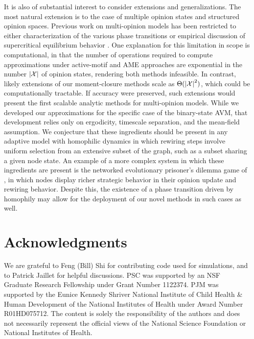 \documentclass[review, onefignum, onetabnum]{siamart171218}
\newcommand{\pc}[1]{{\color{comment_purple}[PC: #1]}}
\begin{document}
	It is also of substantial interest to consider extensions and generalizations. 
	The most natural extension is to the case of multiple opinion states and structured opinion spaces. 
	Previous work on multi-opinion models has been restricted to either characterization of the various phase transitions \cite{Bohme2012} or empirical discussion of supercritical equilibrium behavior \cite{Shi2013}. 
	One explanation for this limitation in scope is computational, in that the number of operations required to compute approximations under active-motif and AME approaches are exponential in the number $\left|\mathcal{X}\right|$ of opinion states, rendering both methods infeasible. 
	In contrast, likely extensions of our moment-closure methods scale as $\Theta(\left|\mathcal{X}\right|^2)$, which could be computationally tractable. 
	If accuracy were preserved, such extensions would present the first scalable analytic methods for multi-opinion models. 
	While we developed our approximations for the specific case of the binary-state AVM, that development relies only on ergodicity, timescale separation, and the mean-field assumption. 
	We conjecture that these ingredients should be present in any adaptive model with homophilic dynamics in which rewiring steps involve uniform selection from an extensive subset of the graph, such as a subset sharing a given node state. 
	An example of a more complex system in which these ingredients are present is the networked evolutionary prisoner's dilemma game of \cite{Lee2018}, in which nodes display richer strategic behavior in their opinion update and rewiring behavior. 
	Despite this, the existence of a phase transition driven by homophily may allow for the deployment of our novel methods in such cases as well. 

	
\section*{Acknowledgments} 
	We are grateful to Feng (Bill) Shi for contributing code used for simulations, and to Patrick Jaillet for helpful discussions. PSC was supported by an NSF Graduate Research Fellowship under Grant Number 1122374. PJM was supported by the Eunice Kennedy Shriver National Institute of Child Health \& Human Development of the National Institutes of Health under Award Number R01HD075712. The content is solely the responsibility of the authors and does not necessarily represent the official views of the National Science Foundation or National Institutes of Health. %
\end{document}
